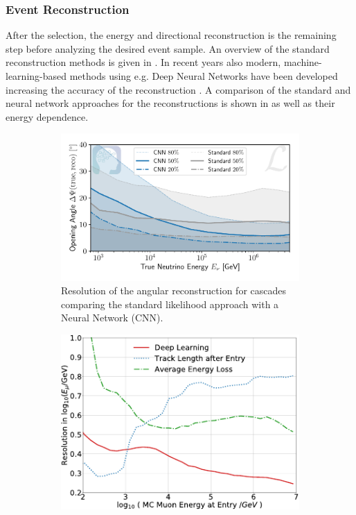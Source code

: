 \subsubsection{Event Reconstruction}

After the selection, the energy and directional reconstruction is the remaining step before analyzing the desired event sample.
An overview of the standard reconstruction methods is given in \cite{AMANDA2004Reco, IceCube2014Ereco}.
In recent years also modern, machine-learning-based methods using e.g. Deep Neural Networks have been developed increasing the accuracy of the reconstruction \cite{Huennefeld17ICRC, Huennefeld17Master, Huennefeld19VLVNT, IceCube20DNN}.
A comparison of the standard and neural network approaches for the reconstructions is shown in  as well as their energy dependence.
\begin{figure}
    \centering
    \begin{subfigure}{0.55\textwidth}
        \centering
        \includegraphics[width=\textwidth]{./images/icecube_resolution_cascade_angular.pdf}
        \caption{Resolution of the angular reconstruction for cascades comparing the standard likelihood approach with a Neural Network (CNN). \cite{IceCube20DNN}}
        \label{fig:icecube_angular_resolution}
    \end{subfigure}
    \hfill
    \begin{subfigure}{0.43\textwidth}
        \centering
        \includegraphics[width=\textwidth]{./images/icecube_resolution_muon_energy.pdf}

\end{subfigure}
\end{figure}
